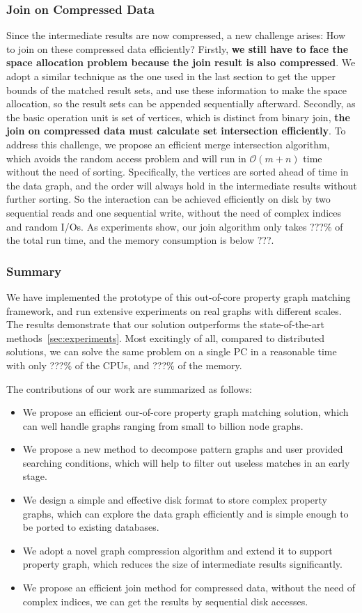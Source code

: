 \subsubsection*{Join on Compressed Data}
Since the intermediate results are now compressed,
a new challenge arises: How to join on these compressed data efficiently?
Firstly, \textbf{we still have to face the space allocation problem because the join result is also compressed}.
We adopt a similar technique as the one used in the last section to get the upper bounds of the matched result sets,
and use these information to make the space allocation, so the result sets can be appended sequentially afterward.
Secondly, as the basic operation unit is set of vertices, which is distinct from binary join,
\textbf{the join on compressed data must calculate set intersection efficiently}.
To address this challenge, we propose an efficient merge intersection algorithm,
which avoids the random access problem and will run in $\mathcal{O}(m + n)$ time without the need of sorting.
Specifically, the vertices are sorted ahead of time in the data graph,
and the order will always hold in the intermediate results without further sorting.
So the interaction can be achieved efficiently on disk by two sequential reads and one sequential write,
without the need of complex indices and random I/Os.
As experiments show, our join algorithm only takes \@???\% of the total run time, and the memory consumption is below \@???.
\subsubsection*{Summary}
We have implemented the prototype of this out-of-core property graph matching framework,
and run extensive experiments on real graphs with different scales.
The results demonstrate that our solution outperforms the state-of-the-art methods~\ref{sec:experiments}.
Most excitingly of all, compared to distributed solutions,
we can solve the same problem on a single PC in a reasonable time with only \@???\% of the CPUs, and \@???\% of the memory.

The contributions of our work are summarized as follows:
\begin{itemize}[noitemsep]
\item We propose an efficient our-of-core property graph matching solution,
  which can well handle graphs ranging from small to billion node graphs.
\item We propose a new method to decompose pattern graphs and user provided searching conditions,
  which will help to filter out useless matches in an early stage.
\item We design a simple and effective disk format to store complex property graphs,
  which can explore the data graph efficiently and is simple enough to be ported to existing databases.
\item We adopt a novel graph compression algorithm and extend it to support property graph,
  which reduces the size of intermediate results significantly.
\item We propose an efficient join method for compressed data, without the need of complex indices,
  we can get the results by sequential disk accesses.
\end{itemize}

